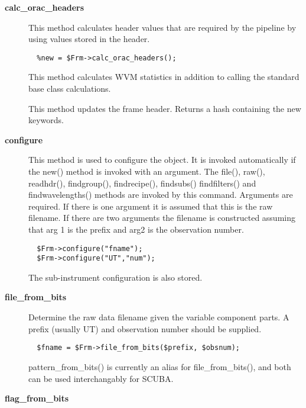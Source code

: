 \begin{description}

\item[{\textbf{calc\_orac\_headers}}] \mbox{}

This method calculates header values that are required by the
pipeline by using values stored in the header.

\begin{verbatim}
  %new = $Frm->calc_orac_headers();
\end{verbatim}


This method calculates WVM statistics in addition to calling
the standard base class calculations.



This method updates the frame header.
Returns a hash containing the new keywords.


\item[{\textbf{configure}}] \mbox{}

This method is used to configure the object. It is invoked
automatically if the new() method is invoked with an argument. The
file(), raw(), readhdr(), findgroup(), findrecipe(), findsubs()
findfilters() and findwavelengths() methods are
invoked by this command. Arguments are required.
If there is one argument it is assumed that this is the
raw filename. If there are two arguments the filename is
constructed assuming that arg 1 is the prefix and arg2 is the
observation number.

\begin{verbatim}
  $Frm->configure("fname");
  $Frm->configure("UT","num");
\end{verbatim}


The sub-instrument configuration is also stored.


\item[{\textbf{file\_from\_bits}}] \mbox{}

Determine the raw data filename given the variable component
parts. A prefix (usually UT) and observation number should
be supplied.

\begin{verbatim}
  $fname = $Frm->file_from_bits($prefix, $obsnum);
\end{verbatim}


pattern\_from\_bits() is currently an alias for file\_from\_bits(),
and both can be used interchangably for SCUBA.


\item[{\textbf{flag\_from\_bits}}] \mbox{}


\end{description}
